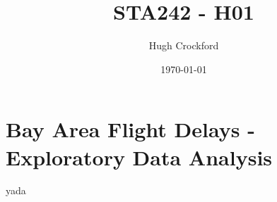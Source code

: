 \documentclass[12pt]{article}
\title{STA242 - H01}
\author{Hugh Crockford}
\date{\today}
\begin{document}
	\section{Bay Area Flight Delays - Exploratory Data Analysis}
		yada
\end{document}
